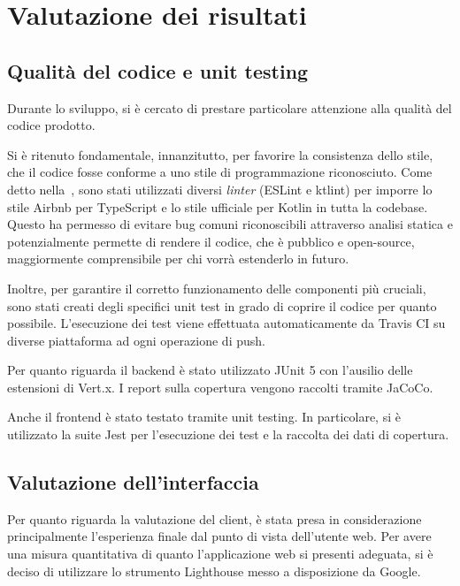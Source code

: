 \chapter{Valutazione dei risultati}\label{ch:evaluation}

  \section{Qualità del codice e unit testing}
    Durante lo sviluppo, si è cercato di prestare particolare attenzione alla qualità del codice prodotto.

    Si è ritenuto fondamentale, innanzitutto, per favorire la consistenza dello stile, che il codice fosse conforme a uno stile di programmazione riconosciuto.
    Come detto nella~, sono stati utilizzati diversi \emph{linter} (ESLint e ktlint)
    per imporre lo stile Airbnb per TypeScript e lo stile ufficiale per Kotlin in tutta la codebase.
    Questo ha permesso di evitare bug comuni riconoscibili attraverso analisi statica
    e potenzialmente permette di rendere il codice, che è pubblico e open-source, maggiormente comprensibile per chi vorrà estenderlo in futuro.

    Inoltre, per garantire il corretto funzionamento delle componenti più cruciali, sono stati creati degli specifici unit test in grado di coprire il codice per quanto possibile.
    L'esecuzione dei test viene effettuata automaticamente da Travis CI su diverse piattaforma ad ogni operazione di push.

    Per quanto riguarda il backend è stato utilizzato JUnit 5 con l'ausilio delle estensioni di Vert.x.
    I report sulla copertura vengono raccolti tramite JaCoCo.


    Anche il frontend è stato testato tramite unit testing.
    In particolare, si è utilizzato la suite Jest per l'esecuzione dei test e la raccolta dei dati di copertura.


  \section{Valutazione dell'interfaccia}
    Per quanto riguarda la valutazione del client, è stata presa in considerazione principalmente l'esperienza finale dal punto di vista dell'utente web.
    Per avere una misura quantitativa di quanto l'applicazione web si presenti adeguata, si è deciso di utilizzare lo strumento Lighthouse messo a disposizione da Google.

